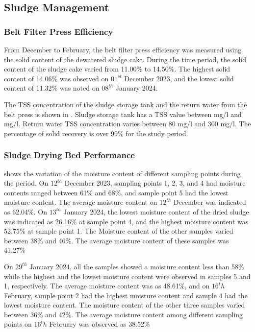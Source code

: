 \newpage
\subsection{Sludge Management}

\subsubsection{Belt Filter Press Efficiency}
From December to February, the belt filter press efficiency was measured using the solid content of the dewatered sludge cake. During the time period, the solid content of the sludge cake varied from 11.00\% to 14.50\%. The highest solid content of 14.06\% was observed on $01^{st}$ December 2023, and the lowest solid content of 11.32\% was noted on $08^{th}$ January 2024.

The \ac{TSS} concentration of the sludge storage tank and the return water from the belt press is shown in . Sludge storage tank has a \ac{TSS} value between  mg/l and  mg/l. Return water \ac{TSS} concentration varies between 80 mg/l and 300 mg/l. The percentage of solid recovery is over 99\% for the study period.






\subsubsection{Sludge Drying Bed Performance}
 shows the variation of the moisture content of different sampling points during the period. On $12^{th}$ December 2023, sampling points 1, 2, 3, and 4 had moisture contents ranged between 61\% and 68\%, and sample point 5 had the lowest moisture content. The average moisture content on $12^{th}$ December was indicated as 62.04\%. On $13^{th}$ January 2024, the lowest moisture content of the dried sludge was indicated as 26.16\% at sample point 4, and the highest moisture content was 52.75\% at sample point 1. The Moisture content of the other samples varied between 38\% and 46\%. The average moisture content of these samples was 41.27\%

On $29^{th}$ January 2024, all the samples showed a moisture content less than 58\% while the highest and the lowest moisture content were observed in samples 5 and 1, respectively. The average moisture content was as 48.61\%, and on $16^th$ February, sample point 2 had the highest moisture content and sample 4 had the lowest moisture content. The moisture content of the other three samples varied between 36\% and 42\%. The average moisture content among different sampling points on $16^th$ February was observed as 38.52\%

